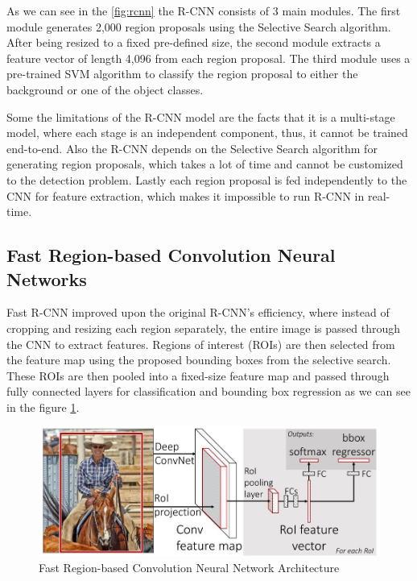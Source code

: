 As we can see in the \ref{fig:rcnn} the R-CNN consists of 3 main modules. The first module generates 2,000 region proposals using the Selective Search 
algorithm. After being resized to a fixed pre-defined size, the second module extracts a feature vector of length 4,096 from each region proposal.
The third module uses a pre-trained SVM algorithm to classify the region proposal to either the background or one of the object classes.


Some the limitations of the R-CNN model are the facts that it is a multi-stage model, where each stage is an independent component, thus, it cannot be 
trained end-to-end. Also the R-CNN depends on the Selective Search algorithm for generating region proposals, which takes a lot of time and cannot be 
customized to the detection problem. Lastly each region proposal is fed independently to the CNN for feature extraction, which makes it impossible to 
run R-CNN in real-time.

\subsection{Fast Region-based Convolution Neural Networks}

Fast R-CNN improved upon the original R-CNN's efficiency, where instead of cropping and resizing each region separately, the entire image is passed through the 
CNN to extract features. Regions of interest (ROIs) are then selected from the feature map using the proposed bounding boxes from the selective search. 
These ROIs are then pooled into a fixed-size feature map and passed through fully connected layers for classification and bounding box regression as we can see 
in the figure \ref{fig:fast-rcnn}.

\begin{figure}[h!]
    \centering
    \includegraphics[scale=0.4]{Figures/fast-r-cnn.png}
    \caption{Fast Region-based Convolution Neural Network Architecture}
    \label{fig:fast-rcnn}
\end{figure}

